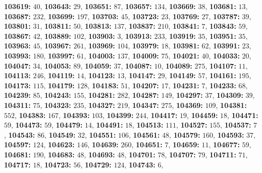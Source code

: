 \textsf{\bfseries 103619:} $40$, \textsf{\bfseries 103643:} $29$, \textsf{\bfseries 103651:} $87$, \textsf{\bfseries 103657:} $134$, \textsf{\bfseries 103669:} $38$, \textsf{\bfseries 103681:} $13$, \textsf{\bfseries 103687:} $232$, \textsf{\bfseries 103699:} $197$, \textsf{\bfseries 103703:} $45$, \textsf{\bfseries 103723:} $23$, \textsf{\bfseries 103769:} $27$, \textsf{\bfseries 103787:} $39$, \textsf{\bfseries 103801:} $31$, \textsf{\bfseries 103811:} $50$, \textsf{\bfseries 103813:} $137$, \textsf{\bfseries 103837:} $210$, \textsf{\bfseries 103841:} $7$, \textsf{\bfseries 103843:} $59$, \textsf{\bfseries 103867:} $42$, \textsf{\bfseries 103889:} $102$, \textsf{\bfseries 103903:} $3$, \textsf{\bfseries 103913:} $233$, \textsf{\bfseries 103919:} $35$, \textsf{\bfseries 103951:} $35$, \textsf{\bfseries 103963:} $45$, \textsf{\bfseries 103967:} $261$, \textsf{\bfseries 103969:} $104$, \textsf{\bfseries 103979:} $18$, \textsf{\bfseries 103981:} $62$, \textsf{\bfseries 103991:} $23$, \textsf{\bfseries 103993:} $180$, \textsf{\bfseries 103997:} $61$, \textsf{\bfseries 104003:} $137$, \textsf{\bfseries 104009:} $75$, \textsf{\bfseries 104021:} $40$, \textsf{\bfseries 104033:} $20$, \textsf{\bfseries 104047:} $34$, \textsf{\bfseries 104053:} $89$, \textsf{\bfseries 104059:} $37$, \textsf{\bfseries 104087:} $10$, \textsf{\bfseries 104089:} $275$, \textsf{\bfseries 104107:} $11$, \textsf{\bfseries 104113:} $246$, \textsf{\bfseries 104119:} $14$, \textsf{\bfseries 104123:} $13$, \textsf{\bfseries 104147:} $29$, \textsf{\bfseries 104149:} $57$, \textsf{\bfseries 104161:} $195$, \textsf{\bfseries 104173:} $115$, \textsf{\bfseries 104179:} $128$, \textsf{\bfseries 104183:} $51$, \textsf{\bfseries 104207:} $17$, \textsf{\bfseries 104231:} $7$, \textsf{\bfseries 104233:} $68$, \textsf{\bfseries 104239:} $85$, \textsf{\bfseries 104243:} $155$, \textsf{\bfseries 104281:} $282$, \textsf{\bfseries 104287:} $149$, \textsf{\bfseries 104297:} $37$, \textsf{\bfseries 104309:} $39$, \textsf{\bfseries 104311:} $75$, \textsf{\bfseries 104323:} $235$, \textsf{\bfseries 104327:} $219$, \textsf{\bfseries 104347:} $275$, \textsf{\bfseries 104369:} $109$, \textsf{\bfseries 104381:} $552$, \textsf{\bfseries 104383:} $167$, \textsf{\bfseries 104393:} $103$, \textsf{\bfseries 104399:} $244$, \textsf{\bfseries 104417:} $19$, \textsf{\bfseries 104459:} $18$, \textsf{\bfseries 104471:} $59$, \textsf{\bfseries 104473:} $59$, \textsf{\bfseries 104479:} $14$, \textsf{\bfseries 104491:} $18$, \textsf{\bfseries 104513:} $111$, \textsf{\bfseries 104527:} $155$, \textsf{\bfseries 104537:} $7$, \textsf{\bfseries 104543:} $86$, \textsf{\bfseries 104549:} $32$, \textsf{\bfseries 104551:} $106$, \textsf{\bfseries 104561:} $48$, \textsf{\bfseries 104579:} $160$, \textsf{\bfseries 104593:} $37$, \textsf{\bfseries 104597:} $124$, \textsf{\bfseries 104623:} $146$, \textsf{\bfseries 104639:} $260$, \textsf{\bfseries 104651:} $7$, \textsf{\bfseries 104659:} $11$, \textsf{\bfseries 104677:} $59$, \textsf{\bfseries 104681:} $190$, \textsf{\bfseries 104683:} $48$, \textsf{\bfseries 104693:} $48$, \textsf{\bfseries 104701:} $78$, \textsf{\bfseries 104707:} $79$, \textsf{\bfseries 104711:} $71$, \textsf{\bfseries 104717:} $18$, \textsf{\bfseries 104723:} $56$, \textsf{\bfseries 104729:} $124$, \textsf{\bfseries 104743:} $6$, 
